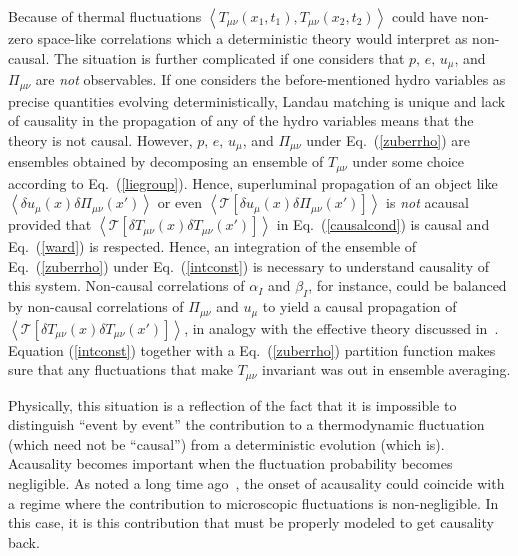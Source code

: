 \documentclass[12pt,onecolumn,showpacs,amssymb,aps,nofootinbib,floatfix]{revtex4-2}
\newcommand{\ave}[1]{\left\langle #1 \right\rangle}
\renewcommand{\eqref}[1]{Eq.~(\ref{#1})}
\newcommand{\tcomm}[1]{\mathcal{T}\left[ #1\right]}
\begin{document}
	
	Because of thermal fluctuations 
	$\ave{T_{\mu \nu}(x_1,t_1),T_{\mu \nu}(x_2,t_2)}$ could have non-zero space-like correlations which a deterministic theory would interpret as non-causal.   The situation is further complicated if one considers that $p,\,e,\,u_\mu$, and $\Pi_{\mu \nu}$ are {\em not} observables.
	If one considers the before-mentioned hydro variables as precise quantities evolving deterministically, Landau matching is unique and lack of
	causality in the propagation of any of the hydro variables means that the theory is not causal.
	However, $p,\,e,\,u_\mu$, and $\Pi_{\mu \nu}$ under \eqref{zuberrho} are  ensembles obtained by decomposing an ensemble of $T_{\mu \nu}$ under some choice according to \eqref{liegroup}.
	Hence, superluminal propagation of an object like $\ave{\delta u_\mu(x) \delta \Pi_{\mu \nu}(x')}$ or even $\ave{\tcomm{\delta u_\mu(x) \delta \Pi_{\mu \nu}(x')}}$  is {\em not} acausal provided that $\ave{\tcomm{ \delta T_{\mu \nu}(x)\delta T_{\mu \nu}(x')}}$ in \eqref{causalcond} is causal and \eqref{ward} is respected.
	Hence, an integration of the ensemble of \eqref{zuberrho} under \eqref{intconst} is necessary to understand causality of this system. Non-causal correlations of $\alpha_I$ and $\beta_I$, for instance, could be balanced by non-causal correlations of $\Pi_{\mu \nu}$ and $u_\mu$ to yield a causal propagation of $\ave{\tcomm{ \delta T_{\mu \nu}(x)\delta T_{\mu \nu}(x')}}$, in analogy with the effective theory discussed in~\cite{glorioso}.  Equation (\ref{intconst}) together with a \eqref{zuberrho} partition function makes sure that any fluctuations that make $T_{\mu \nu}$ invariant was out in ensemble averaging. 
	
	Physically, this situation is a reflection of the fact that it is impossible to distinguish ``event by event'' the contribution to  a thermodynamic fluctuation (which need not be ``causal'') from a deterministic evolution (which is).  Acausality becomes important when the fluctuation probability becomes negligible.
	As noted a long time ago~\cite{ruderman}, the onset of acausality could coincide with a regime where the contribution to microscopic fluctuations is non-negligible.  In this case, it is this contribution that must be properly modeled to get causality back.
	
\end{document}
